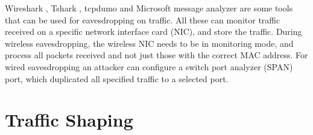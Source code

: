 Wireshark \cite{wireshark}, Tshark \cite{wireshark}, tcpdumo \cite{tcpdump} and Microsoft message analyzer \cite{microsoftmessageanalyzer} are some tools that can be used for eavesdropping on traffic. All these can monitor traffic received on a specific network interface card (NIC), and store the traffic. During wireless eavesdropping, the wireless NIC needs to be in monitoring mode, and process all packets received and not just those with the correct MAC address. For wired eavesdropping an attacker can configure a switch port analyzer (SPAN) port, which duplicated all specified traffic to a selected port. 

\section{Traffic Shaping}





